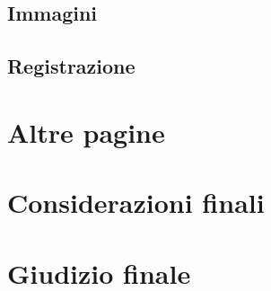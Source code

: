 \documentclass[11pt,a4paper]{article}
\begin{document}
\subsection{Immagini}
\label{subsec:images}

\subsection{Registrazione}
\label{subsec:signup}

\section{Altre pagine}
\label{sec:other-pages}

\section{Considerazioni finali}
\label{sec:final-remarks}

\section{Giudizio finale}
\label{sec:final-vote}
\end{document}
